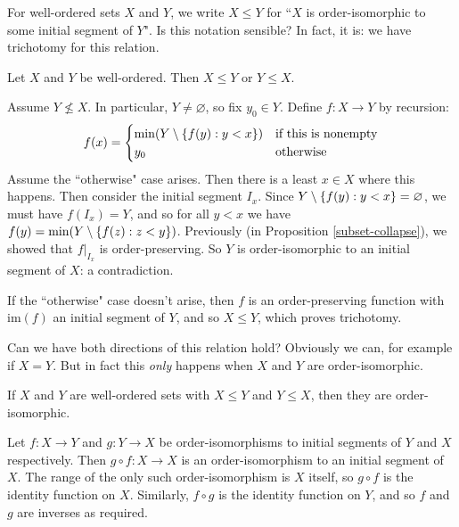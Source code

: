\documentclass{article}
\begin{document}
For well-ordered sets $X$ and $Y$, we write $X \leq Y$ for ``$X$ is order-isomorphic to some initial segment of $Y$". Is this notation sensible? In fact, it is: we have trichotomy for this relation.

\begin{theorem}
    Let $X$ and $Y$ be well-ordered. Then $X \leq Y$ or $Y \leq X$.
\end{theorem}

\begin{prf}
    Assume $Y \not\leq X$. In particular, $Y \neq \varnothing$, so fix $y_0 \in Y$. Define $f: X \to Y$ by recursion:
    \[
	f(x) = \begin{cases}
		\min(Y \setminus\left\lbrace f(y) : y < x \right\rbrace) & \text{if this is nonempty} \\
		y_0 & \!\mathrel{\, \text{otherwise}}
	\end{cases}
	\]
	Assume the ``otherwise" case arises. Then there is a least $x \in X$ where this happens. Then consider the initial segment $I_x$. Since $Y \setminus\left\lbrace f(y) : y < x \right\rbrace = \varnothing$, we must have $f(I_x) = Y$, and so for all $y < x$ we have $f(y) = \min (Y \setminus \left\lbrace f(z) : z < y \right\rbrace)$. Previously (in Proposition \ref{subset-collapse}), we showed that $f|_{I_x}$ is order-preserving. So $Y$ is order-isomorphic to an initial segment of $X$: a contradiction.
	
	If the ``otherwise" case doesn't arise, then $f$ is an order-preserving function with $\mathrm{im}(f)$ an initial segment of $Y$, and so $X \leq Y$, which proves trichotomy.
\end{prf}

Can we have both directions of this relation hold? Obviously we can, for example if $X = Y$. But in fact this \textit{only} happens when $X$ and $Y$ are order-isomorphic.

\begin{proposition}
    If $X$ and $Y$ are well-ordered sets with $X \leq Y$ and $Y \leq X$, then they are order-isomorphic.
\end{proposition}

\begin{prf}
    Let $f: X \to Y$ and $g: Y \to X$ be order-isomorphisms to initial segments of $Y$ and $X$ respectively. Then $g \circ f: X \to X$ is an order-isomorphism to an initial segment of $X$. The range of the  only such order-isomorphism is $X$ itself, so $g \circ f$ is the identity function on $X$. Similarly, $f \circ g$ is the identity function on $Y$, and so $f$ and $g$ are inverses as required.
\end{prf}
\end{document}
